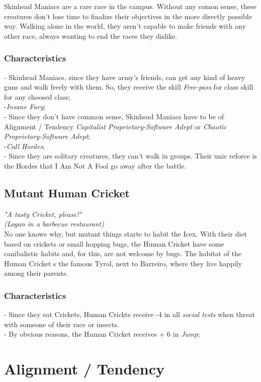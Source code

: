\documentclass[ letterpaper,12pt]{article}
\begin{document}
Skinhead Maniacs are a rare race in the campus. Without any comon sense, these creatures don't lose time to finalize their objectives in the more directly possible way. Walking alone in the world, they aren't capable to make friends with any other race, always wanting to end the races they dislike.

\subsubsection{Characteristics}
- Skinhead Maniacs, since they have army's friends, can get any kind of heavy guns and walk freely with them. So, they receive the skill {\it Free-pass} for class skill for any choosed class;\\
-{\it Insane Fury};\\
- Since they don't have common sense, Skinhead Maniacs have to be of Alignment / Tendency {\it Capitalist Proprietary-Software Adept} or {\it Chaotic Proprietary-Software Adept};\\
-{\it Call Hordes};\\
- Since they are solitary creatures, they can't walk in groups. Their unic reforce is the Hordes that I Am Not A Fool go away after the battle.

\subsection{Mutant Human Cricket}
{\it "A tasty Cricket, please!"\\
(Logan in a barbecue restaurant)}\\

No one knows why, but mutant things starte to habit the Icex. With their diet based on crickets or small hopping bugs, the Human Cricket have some canibalistic habits and, for this, are not welcome by bugs. The habitat of the Human Cricket s the famous Tyrol, next to Barreiro, where they live happily among their parents.

\subsubsection{Characteristics}
- Since they eat Crickets, Human Crickts receive -4 in all {\it social tests} when threat with someone of their race or insects.\\
- By obvious reasons, the Human Cricket receives + 6 in {\it Jump};\\


\section{Alignment / Tendency}
\end{document}
